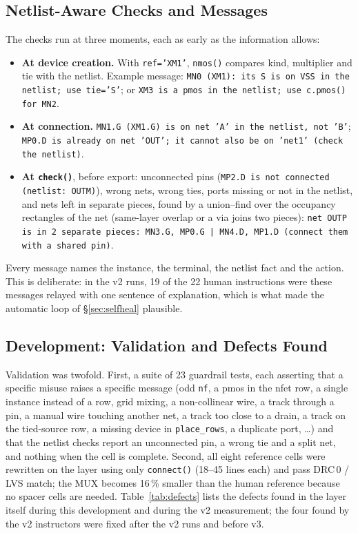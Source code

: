 \documentclass[conference]{IEEEtran}
\newcommand{\code}[1]{\texttt{#1}}
\begin{document}
\subsection{Netlist-Aware Checks and Messages}
The checks run at three moments, each as early as the information allows:
\begin{itemize}
\item \textbf{At device creation.} With \code{ref='XM1'}, \code{nmos()} compares kind, multiplier and tie with the netlist. Example message: \code{MN0 (XM1): its S is on VSS in the netlist; use tie='S'}; or \code{XM3 is a pmos in the netlist; use c.pmos() for MN2}.
\item \textbf{At connection.} \code{MN1.G (XM1.G) is on net 'A' in the netlist, not 'B'}; \code{MP0.D is already on net 'OUT'; it cannot also be on 'net1' (check the netlist)}.
\item \textbf{At \code{check()}}, before export: unconnected pins (\code{MP2.D is not connected (netlist: OUTM)}), wrong nets, wrong ties, ports missing or not in the netlist, and nets left in separate pieces, found by a union--find over the occupancy rectangles of the net (same-layer overlap or a via joins two pieces): \code{net OUTP is in 2 separate pieces: MN3.G, MP0.G | MN4.D, MP1.D (connect them with a shared pin)}.
\end{itemize}
Every message names the instance, the terminal, the netlist fact and the action. This is deliberate: in the v2 runs, 19 of the 22 human instructions were these messages relayed with one sentence of explanation, which is what made the automatic loop of \S\ref{sec:selfheal} plausible.

\subsection{Development: Validation and Defects Found}
Validation was twofold. First, a suite of 23 guardrail tests, each asserting that a specific misuse raises a specific message (odd \code{nf}, a pmos in the nfet row, a single instance instead of a row, grid mixing, a non-collinear wire, a track through a pin, a manual wire touching another net, a track too close to a drain, a track on the tied-source row, a missing device in \code{place\_rows}, a duplicate port, \ldots) and that the netlist checks report an unconnected pin, a wrong tie and a split net, and nothing when the cell is complete. Second, all eight reference cells were rewritten on the layer using only \code{connect()} (18--45 lines each) and pass DRC\,0 / LVS match; the MUX becomes 16\,\% smaller than the human reference because no spacer cells are needed. Table~\ref{tab:defects} lists the defects found in the layer itself during this development and during the v2 measurement; the four found by the v2 instructors were fixed after the v2 runs and before v3.
\end{document}
